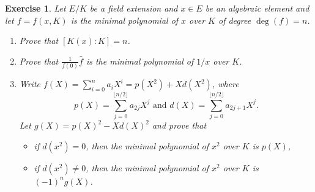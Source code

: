 \documentclass[a4paper,10pt,reqno]{amsart}
\newtheorem{ex}{Exercise}[section]
\begin{document}
\begin{ex}
\label{3.2}
    Let $E/K$ be a field extension and $x\in E$ be an algebraic element and let $f=f(x,K)$ is the minimal polynomial of $x$ over $K$ of degree $\deg(f)=n$.
    \begin{enumerate}[label=(\roman*)]
    \item Prove that $[K(x):K]=n$.
    \item Prove that $\frac{1}{f(0)}\widehat{f}$ is the minimal polynomial of $1/x$ over $K$.
    \item Write $f(X)=\sum_{i=0}^na_iX^i=p(X^2)+Xd(X^2)$, where 
    \[
    p(X)=\sum_{j=0}^{\lfloor n/2\rfloor } a_{2j}X^{j}\text { and }
    d(X)=\sum_{j=0}^{\lfloor n/2\rfloor } a_{2j+1}X^j.
    \]
    Let $g(X)=p(X)^2-Xd(X)^2$ and prove that
    \begin{itemize}
        \item if $d(x^2)=0$, then the minimal polynomial of $x^2$ over $K$ is $p(X)$,
        \item if $d(x^2)\neq 0$, then the minimal polynomial of $x^2$ over $K$ is $(-1)^ng(X)$.
    \end{itemize}
    \noindent
    \end{enumerate}
\end{ex}
\end{document}

